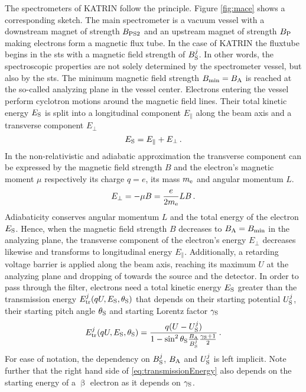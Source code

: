 The spectrometers of KATRIN follow the  principle. Figure \ref{fig:mace} shows a corresponding sketch. The main spectrometer is a vacuum vessel with a downstream magnet of strength $B_\mathrm{PS2}$ and an upstream magnet of strength $B_\mathrm{P}$ making electrons form a magnetic flux tube. In the case of KATRIN the fluxtube begins in the \gls{sts} with a magnetic field strength of $B^j_\mathrm{S}$. In other words, the spectroscopic properties are not solely determined by the spectrometer vessel, but also by the \gls{sts}. The minimum magnetic field strength $B_\mathrm{min} = B_\mathrm{A}$ is reached at the so-called analyzing plane in the vessel center. Electrons entering the vessel perform cyclotron motions around the magnetic field lines. Their total kinetic energy $E_\mathrm{S}$ is split into a longitudinal component $E_\parallel$ along the beam axis and a transverse component $E_\bot$
\begin{equation}
    \label{eq:totalKinElecEnergy}
    E_\mathrm{S} = E_\parallel + E_\bot \text{\,.}
\end{equation}
In the non-relativistic and adiabatic approximation the transverse component can be expressed by the magnetic field strength $B$ and the electron's magnetic moment $\mu$ respectively its charge $q=e$, its mass $m_{\mathrm{e}}$ and angular momentum $L$.
\begin{equation}
    E_\bot = - \mu B = \frac{e}{2 m_{\mathrm{e}}}LB \text{\,.}
\end{equation}
Adiabaticity conserves angular momentum $L$ and the total energy of the electron $E_\mathrm{S}$. Hence, when the magnetic field strength $B$ decreases to $B_\mathrm{A}=B_\mathrm{min}$ in the analyzing plane, the transverse component of the electron's energy $E_\bot$ decreases likewise and transforms to longitudinal energy $E_\parallel$. Additionally, a retarding voltage barrier is applied along the beam axis, reaching its maximum $U$ at the analyzing plane and dropping of towards the source and the detector. 
In order to pass through the filter, electrons need a total kinetic energy $E_\mathrm{S}$ greater than the transmission energy $E^j_\mathrm{tr}(qU,E_\mathrm{S},\theta_\mathrm{S})$ that depends on their starting potential $U^j_\mathrm{S}$, their starting pitch angle $\theta_\mathrm{S}$ and starting Lorentz factor $\gamma_\mathrm{S}$
\begin{equation}
    \label{eq:transmissionEnergy}
    E^j_\mathrm{tr}(qU,E_\mathrm{S},\theta_\mathrm{S}) = 
    \frac{
        q(U-U^j_\mathrm{S})
    }{
        1-\sin^2\theta_\mathrm{S} \frac{B_\mathrm{A}}{B^j_\mathrm{S}} \frac{\gamma_\mathrm{S}+1}{2}
    }
    \text{\,.}
\end{equation}
For ease of notation, the dependency on $B^j_\mathrm{S}$, $B_\mathrm{A}$ and $U^j_\mathrm{S}$ is left implicit. Note further that the right hand side of \eqref{eq:transmissionEnergy} also depends on the starting energy of a $\upbeta$ electron as it depends on $\gamma_\mathrm{S}$.

